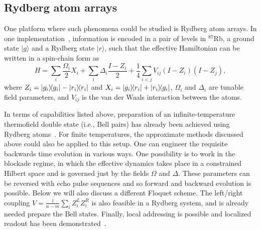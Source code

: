 \documentclass[aps,pra,reprint,floatfix,superscriptaddress, nofootinbib,longbibliography,onecolumn,notitlepage,12pt, tightenlines]{revtex4-1}
\newcommand{\proj}[1]{\ket{#1}\!\!\bra{#1}}
\newcommand{\ketbra}[2]{\ket{#1}\!\!\bra{#2}}
\begin{document}
\subsection{Rydberg atom arrays}
One platform where such phenomena could be studied is Rydberg atom arrays. In one implementation~\cite{Bernien_2017}, information is encoded in a pair of levels in $^{87}$Rb, a ground state $|g\rangle$ and a Rydberg state $|r\rangle$, such that the effective Hamiltonian can be written in a spin-chain form as
\begin{equation}
    H= \sum_i \frac{\Omega_i}{2}X_i + \sum_i \Delta_i \frac{I - Z_i}{2} + \frac{1}{4}\sum_{i<j}V_{ij}(I-Z_i)(I-Z_j),
\end{equation}
where $Z_i = \proj{g_i} - \proj{r_i}$ and $X_i = \ketbra{g_i}{r_i} + \ketbra{r_i}{g_i}$, $\Omega_i$ and $\Delta_i$ are tunable field parameters, and $V_{ij}$ is the van der Waals interaction between the atoms.

In terms of capabilities listed above, preparation of an infinite-temperature thermofield double state (i.e., Bell pairs) has already been achieved using Rydberg atoms~\cite{RydbergBellPairs}. For finite temperatures, the approximate methods discussed above could also be applied to this setup. One can engineer the requisite backwards time evolution in various ways. One possibility is to work in the blockade regime, in which the effective dynamics takes place in a constrained Hilbert space and is governed just by the fields $\Omega$ and $\Delta$. These parameters can be reversed with echo pulse sequences and so forward and backward evolution is possible. Below we will also discuss a different Floquet scheme. The left/right coupling $V = \frac{1}{n-m} \sum_i Z_i^L Z_i^R$ is also feasible in a Rydberg system, and is already needed prepare the Bell states. Finally, local addressing is possible and localized readout has been demonstrated~\cite{Bernien_2017}.
\end{document}
